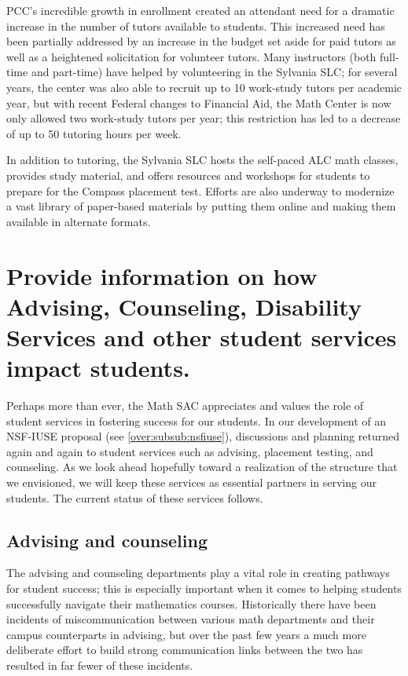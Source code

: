 PCC's incredible growth in enrollment created an attendant need for a dramatic
increase in the number of tutors available to students. This increased need has
been partially addressed by an increase in the budget set aside for paid tutors
as well as a heightened solicitation for volunteer tutors. Many
instructors (both full-time and part-time) have helped by volunteering in the
Sylvania SLC; for several years, the center was also able to recruit up to 10
work-study tutors per academic year, but with recent Federal changes to
Financial Aid, the Math Center is now only allowed two work-study tutors per
year; this restriction has led to a decrease of up to 50 tutoring hours per
week.

In addition to tutoring, the Sylvania SLC hosts the self-paced ALC math
classes, provides study material, and offers resources and workshops for
students to prepare for the Compass placement test. Efforts are also underway
to modernize a vast library of paper-based materials by putting them online and
making them available in alternate formats.


\section[Student services]{Provide information on how Advising, Counseling, Disability Services and other student services impact students. }

Perhaps more than ever, the Math SAC appreciates and values the role of student services in fostering success for our 
students. In our development of an NSF-IUSE proposal (see \vref{over:subsub:nsfiuse}), discussions and 
planning returned again and again to student services such as advising, placement testing, and counseling. As we look ahead hopefully toward a realization of the structure that we envisioned, we will keep these services as essential partners in serving our students. The current status of these services follows.

\subsection{Advising and counseling}
The advising and counseling departments play a vital role in creating pathways
for student success; this is especially important when it comes to helping
students successfully navigate their mathematics courses.  Historically there
have been incidents of miscommunication between various math departments and
their campus counterparts in advising, but over the past few years a much more
deliberate effort to build strong communication links  between the two has
resulted in far fewer of these incidents.

